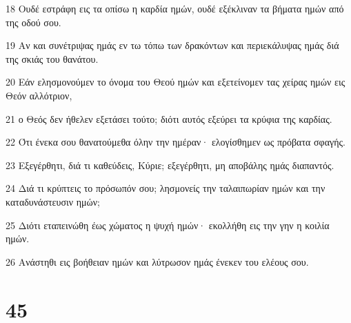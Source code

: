 \par 18 Ουδέ εστράφη εις τα οπίσω η καρδία ημών, ουδέ εξέκλιναν τα βήματα ημών από της οδού σου.
\par 19 Αν και συνέτριψας ημάς εν τω τόπω των δρακόντων και περιεκάλυψας ημάς διά της σκιάς του θανάτου.
\par 20 Εάν ελησμονούμεν το όνομα του Θεού ημών και εξετείνομεν τας χείρας ημών εις Θεόν αλλότριον,
\par 21 ο Θεός δεν ήθελεν εξετάσει τούτο; διότι αυτός εξεύρει τα κρύφια της καρδίας.
\par 22 Ότι ένεκα σου θανατούμεθα όλην την ημέραν· ελογίσθημεν ως πρόβατα σφαγής.
\par 23 Εξεγέρθητι, διά τι καθεύδεις, Κύριε; εξεγέρθητι, μη αποβάλης ημάς διαπαντός.
\par 24 Διά τι κρύπτεις το πρόσωπόν σου; λησμονείς την ταλαιπωρίαν ημών και την καταδυνάστευσιν ημών;
\par 25 Διότι εταπεινώθη έως χώματος η ψυχή ημών· εκολλήθη εις την γην η κοιλία ημών.
\par 26 Ανάστηθι εις βοήθειαν ημών και λύτρωσον ημάς ένεκεν του ελέους σου.

\chapter{45}

